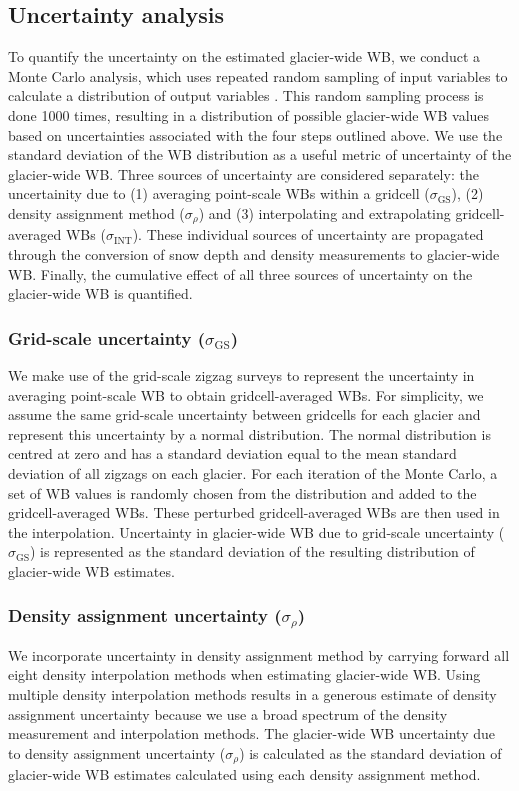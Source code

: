 \documentclass[twocolumn, letterpaper]{igs}
\begin{document}
\subsection{Uncertainty analysis}

To quantify the uncertainty on the estimated glacier-wide WB, we conduct a Monte Carlo analysis, which uses repeated random sampling of input variables to calculate a distribution of output variables \citep{Metropolis1949}. This random sampling process is done 1000 times, resulting in a distribution of possible glacier-wide WB values based on uncertainties associated with the four steps outlined above. We use the standard deviation of the WB distribution as a useful metric of uncertainty of the glacier-wide WB. Three sources of uncertainty are considered separately: the uncertainity due to (1) averaging point-scale WBs within a gridcell ($\sigma_{\mathrm{GS}}$), (2) density assignment method ($\sigma_{\rho}$) and (3) interpolating and extrapolating gridcell-averaged WBs ($\sigma_{\mathrm{INT}}$). These individual sources of uncertainty are propagated through the conversion of snow depth and density measurements to glacier-wide WB. Finally, the cumulative effect of all three sources of uncertainty on the glacier-wide WB is quantified.

	\subsubsection{Grid-scale uncertainty ($\sigma_{\mathrm{GS}}$)}
We make use of the grid-scale zigzag surveys to represent the uncertainty in averaging point-scale WB to obtain gridcell-averaged WBs. For simplicity, we assume the same grid-scale uncertainty between gridcells for each glacier and represent this uncertainty by a normal distribution. The normal distribution is centred at zero and has a standard deviation equal to the mean standard deviation of all zigzags on each glacier. For each iteration of the Monte Carlo, a set of WB values is randomly chosen from the distribution and added to the gridcell-averaged WBs. These perturbed gridcell-averaged WBs are then used in the interpolation. Uncertainty in glacier-wide WB due to  grid-scale uncertainty ($\sigma_{\mathrm{GS}}$) is represented as the standard deviation of the resulting distribution of glacier-wide WB estimates.  

	\subsubsection{Density assignment uncertainty ($\sigma_{\rho}$)}
We incorporate uncertainty in density assignment method by carrying forward all eight density interpolation methods when estimating glacier-wide WB. Using multiple density interpolation methods results in a generous estimate of density assignment uncertainty because we use a broad spectrum of the density measurement and interpolation methods. The glacier-wide WB uncertainty due to density assignment uncertainty ($\sigma_{\rho}$) is calculated as the standard deviation of glacier-wide WB estimates calculated using each density assignment method.
\end{document}

